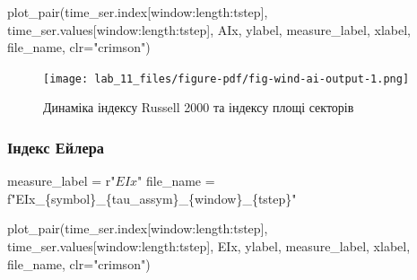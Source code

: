 \documentclass[
  letterpaper,
]{report}
\newenvironment{Shaded}{\begin{snugshade}}{\end{snugshade}}
\newcommand{\NormalTok}[1]{\textcolor[rgb]{0.00,0.23,0.31}{#1}}
\newcommand{\OperatorTok}[1]{\textcolor[rgb]{0.37,0.37,0.37}{#1}}
\newcommand{\SpecialCharTok}[1]{\textcolor[rgb]{0.37,0.37,0.37}{#1}}
\newcommand{\SpecialStringTok}[1]{\textcolor[rgb]{0.13,0.47,0.30}{#1}}
\newcommand{\StringTok}[1]{\textcolor[rgb]{0.13,0.47,0.30}{#1}}
\newcommand{\VerbatimStringTok}[1]{\textcolor[rgb]{0.13,0.47,0.30}{#1}}
\begin{document}
\begin{Shaded}
\begin{Highlighting}[]
\NormalTok{plot\_pair(time\_ser.index[window:length:tstep],}
\NormalTok{          time\_ser.values[window:length:tstep],}
\NormalTok{          AIx, }
\NormalTok{          ylabel, }
\NormalTok{          measure\_label,}
\NormalTok{          xlabel,}
\NormalTok{          file\_name, }
\NormalTok{          clr}\OperatorTok{=}\StringTok{"crimson"}\NormalTok{)}
\end{Highlighting}
\end{Shaded}

\begin{figure}[H]

{\centering \texttt{[image: lab\_11\_files/figure-pdf/fig-wind-ai-output-1.png]}

}

\caption{\label{fig-wind-ai}Динаміка індексу Russell 2000 та індексу
площі секторів}

\end{figure}

\hypertarget{ux456ux43dux434ux435ux43aux441-ux435ux439ux43bux435ux440ux430}{%
\subsubsection{Індекс
Ейлера}\label{ux456ux43dux434ux435ux43aux441-ux435ux439ux43bux435ux440ux430}}

\begin{Shaded}
\begin{Highlighting}[]
\NormalTok{measure\_label }\OperatorTok{=} \VerbatimStringTok{r"$EIx$"}
\NormalTok{file\_name }\OperatorTok{=} \SpecialStringTok{f"EIx\_}\SpecialCharTok{\{}\NormalTok{symbol}\SpecialCharTok{\}}\SpecialStringTok{\_}\SpecialCharTok{\{}\NormalTok{tau\_assym}\SpecialCharTok{\}}\SpecialStringTok{\_}\SpecialCharTok{\{}\NormalTok{window}\SpecialCharTok{\}}\SpecialStringTok{\_}\SpecialCharTok{\{}\NormalTok{tstep}\SpecialCharTok{\}}\SpecialStringTok{"}
\end{Highlighting}
\end{Shaded}

\begin{Shaded}
\begin{Highlighting}[]
\NormalTok{plot\_pair(time\_ser.index[window:length:tstep],}
\NormalTok{          time\_ser.values[window:length:tstep],}
\NormalTok{          EIx, }
\NormalTok{          ylabel, }
\NormalTok{          measure\_label,}
\NormalTok{          xlabel,}
\NormalTok{          file\_name, }
\NormalTok{          clr}\OperatorTok{=}\StringTok{"crimson"}\NormalTok{)}
\end{Highlighting}
\end{Shaded}
\end{document}
